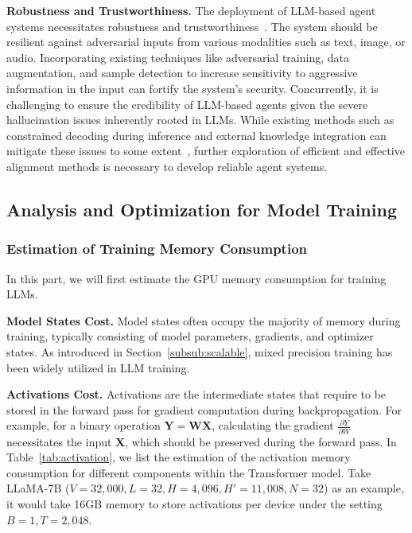 \textbf{Robustness and Trustworthiness.} The deployment of LLM-based agent systems necessitates robustness and trustworthiness~\cite{Hua-2024-TrustAgent-arxiv}. The system should be resilient against adversarial inputs from various modalities such as text, image, or audio. Incorporating existing techniques like adversarial training, data augmentation, and sample detection to increase sensitivity to aggressive information in the input can fortify the system's security. Concurrently, it is challenging to ensure the credibility of LLM-based agents given the severe hallucination issues inherently rooted in LLMs. While existing methods such as constrained decoding during inference and external knowledge integration can mitigate these issues to some extent~\cite{Huang-2023-A-arxiv}, further exploration of efficient and effective alignment methods is necessary to develop reliable agent systems.

\subsection{Analysis and Optimization for Model Training} 
\label{sec:training-effi}

\subsubsection{Estimation of Training Memory Consumption} In this part, we will first estimate the GPU memory consumption for training LLMs.

\textbf{Model States Cost.} Model states often occupy the majority of memory during training, typically consisting of model parameters, gradients, and optimizer states. As introduced in Section~\ref{subsub:scalable}, mixed precision training has been widely utilized in LLM training. 

\textbf{Activations Cost.} Activations are the intermediate states that require to be stored in the forward pass for gradient computation during backpropagation. For example, for a binary operation $\bm{Y}=\bm{W}\bm{X}$, calculating the gradient $\frac{\partial Y}{\partial W}$ necessitates the input $\bm{X}$, which should be preserved during the forward pass. In Table~\ref{tab:activation}, we list the estimation of the activation memory consumption for different components within the Transformer model. Take LLaMA-7B ($V=32,000,L=32,H=4,096,H'=11,008,N=32$)  as an example, it would take 16GB memory to store activations per device under the setting $B=1,T=2,048$. 

